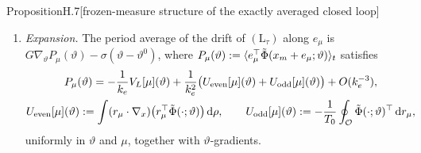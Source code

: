 \begin{thm}{Proposition}{H.7}[frozen-measure structure of the exactly averaged closed loop]
\begin{enumerate}[label=(\alph*)]
  \item \emph{Expansion.} The period average of the drift of $(\mathrm{L}_\tau)$ along $e_\mu$ is
    $G\nabla_\vartheta P_\mu(\vartheta) - \sigma(\vartheta-\vartheta^0)$, where
    $P_\mu(\vartheta) := \langle e_\mu^\top\tilde\Phi(x_m+e_\mu;\vartheta)\rangle_t$ satisfies
    \begin{gather}
      P_\mu(\vartheta) = -\frac{1}{k_e}V_L[\mu](\vartheta)
        + \frac{1}{k_e^2}\bigl(U_{\mathrm{even}}[\mu](\vartheta) + U_{\mathrm{odd}}[\mu](\vartheta)\bigr)
        + O(k_e^{-3}),\label{eq:finitegain:Pmu}\\
      U_{\mathrm{even}}[\mu](\vartheta) := \int(r_\mu\cdot\nabla_x)\bigl(r_\mu^\top\tilde\Phi(\cdot;\vartheta)\bigr)\,\mathrm{d}\rho,
      \qquad
      U_{\mathrm{odd}}[\mu](\vartheta) := -\frac{1}{T_0}\oint_{\mathcal{O}}\tilde\Phi(\cdot;\vartheta)^\top\,\mathrm{d} r_\mu,
      \label{eq:finitegain:Ueo}
    \end{gather}
    uniformly in $\vartheta$ and $\mu$, together with $\vartheta$-gradients.


\end{enumerate}
\end{thm}
